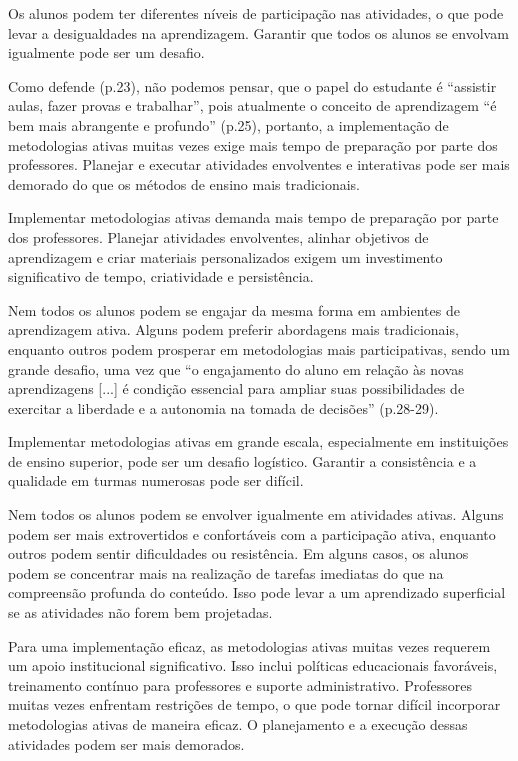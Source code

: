 Os alunos podem ter diferentes níveis de participação nas atividades, o que pode levar a desigualdades na aprendizagem. Garantir que todos os alunos se envolvam igualmente pode ser um desafio.

Como defende  (p.23), não podemos pensar, que o papel do estudante é ``assistir aulas, fazer provas e trabalhar'', pois atualmente o conceito de aprendizagem ``é bem mais abrangente e profundo'' (p.25), portanto, a implementação de metodologias ativas muitas vezes exige mais tempo de preparação por parte dos professores. Planejar e executar atividades envolventes e interativas pode ser mais demorado do que os métodos de ensino mais tradicionais.

Implementar metodologias ativas demanda mais tempo de preparação por parte dos professores. Planejar atividades envolventes, alinhar objetivos de aprendizagem e criar materiais personalizados exigem um investimento significativo de tempo, criatividade e persistência.

Nem todos os alunos podem se engajar da mesma forma em ambientes de aprendizagem ativa. Alguns podem preferir abordagens mais tradicionais, enquanto outros podem prosperar em metodologias mais participativas, sendo um grande desafio, uma vez que ``o engajamento do aluno em relação às novas aprendizagens [...] é condição essencial para ampliar suas possibilidades de exercitar a liberdade e a autonomia na tomada de decisões'' \cite{BERBEL2011} (p.28-29).

Implementar metodologias ativas em grande escala, especialmente em instituições de ensino superior, pode ser um desafio logístico. Garantir a consistência e a qualidade em turmas numerosas pode ser difícil.

Nem todos os alunos podem se envolver igualmente em atividades ativas. Alguns podem ser mais extrovertidos e confortáveis com a participação ativa, enquanto outros podem sentir dificuldades ou resistência. Em alguns casos, os alunos podem se concentrar mais na realização de tarefas imediatas do que na compreensão profunda do conteúdo. Isso pode levar a um aprendizado superficial se as atividades não forem bem projetadas.

Para uma implementação eficaz, as metodologias ativas muitas vezes requerem um apoio institucional significativo. Isso inclui políticas educacionais favoráveis, treinamento contínuo para professores e suporte administrativo. Professores muitas vezes enfrentam restrições de tempo, o que pode tornar difícil incorporar metodologias ativas de maneira eficaz. O planejamento e a execução dessas atividades podem ser mais demorados.

